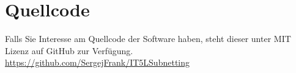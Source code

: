 \section{Quellcode}
Falls Sie Interesse am Quellcode der Software haben, steht dieser unter
MIT Lizenz auf GitHub zur Verfügung.
\url{https://github.com/SergejFrank/IT5LSubnetting}